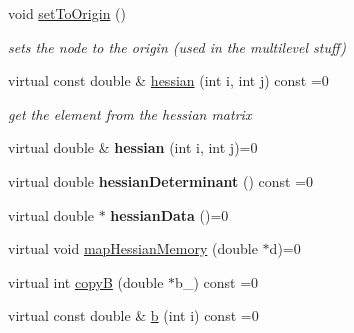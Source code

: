 \begin{DoxyCompactItemize}
\item 
\hypertarget{classg2o_1_1OptimizableGraph_1_1Vertex_ab10678592b5e707bf4abdc0ff6b8e4bf}{void \hyperlink{classg2o_1_1OptimizableGraph_1_1Vertex_ab10678592b5e707bf4abdc0ff6b8e4bf}{set\-To\-Origin} ()}\label{classg2o_1_1OptimizableGraph_1_1Vertex_ab10678592b5e707bf4abdc0ff6b8e4bf}

\begin{DoxyCompactList}\small\item\em sets the node to the origin (used in the multilevel stuff) \end{DoxyCompactList}\item 
\hypertarget{classg2o_1_1OptimizableGraph_1_1Vertex_af46fa4f0baa4c87e29b137f24e713acb}{virtual const double \& \hyperlink{classg2o_1_1OptimizableGraph_1_1Vertex_af46fa4f0baa4c87e29b137f24e713acb}{hessian} (int i, int j) const =0}\label{classg2o_1_1OptimizableGraph_1_1Vertex_af46fa4f0baa4c87e29b137f24e713acb}

\begin{DoxyCompactList}\small\item\em get the element from the hessian matrix \end{DoxyCompactList}\item 
\hypertarget{classg2o_1_1OptimizableGraph_1_1Vertex_ade95d46370bb9a86f64c4e591726ad62}{virtual double \& {\bfseries hessian} (int i, int j)=0}\label{classg2o_1_1OptimizableGraph_1_1Vertex_ade95d46370bb9a86f64c4e591726ad62}

\item 
\hypertarget{classg2o_1_1OptimizableGraph_1_1Vertex_adaed502500d9ddc9f1721aba635da4d6}{virtual double {\bfseries hessian\-Determinant} () const =0}\label{classg2o_1_1OptimizableGraph_1_1Vertex_adaed502500d9ddc9f1721aba635da4d6}

\item 
\hypertarget{classg2o_1_1OptimizableGraph_1_1Vertex_a4ec536d8c82d839e507d89c7a7e368ae}{virtual double $\ast$ {\bfseries hessian\-Data} ()=0}\label{classg2o_1_1OptimizableGraph_1_1Vertex_a4ec536d8c82d839e507d89c7a7e368ae}

\item 
virtual void \hyperlink{classg2o_1_1OptimizableGraph_1_1Vertex_a1008c0f7981a9fb11be3e3df5c4a9758}{map\-Hessian\-Memory} (double $\ast$d)=0
\item 
virtual int \hyperlink{classg2o_1_1OptimizableGraph_1_1Vertex_af544f0050ea6e05950fd6e53931bdf61}{copy\-B} (double $\ast$b\-\_\-) const =0
\item 
\hypertarget{classg2o_1_1OptimizableGraph_1_1Vertex_a79afa60eb11928eeeb1b97f2d2a30732}{virtual const double \& \hyperlink{classg2o_1_1OptimizableGraph_1_1Vertex_a79afa60eb11928eeeb1b97f2d2a30732}{b} (int i) const =0}\label{classg2o_1_1OptimizableGraph_1_1Vertex_a79afa60eb11928eeeb1b97f2d2a30732}


\end{DoxyCompactItemize}
